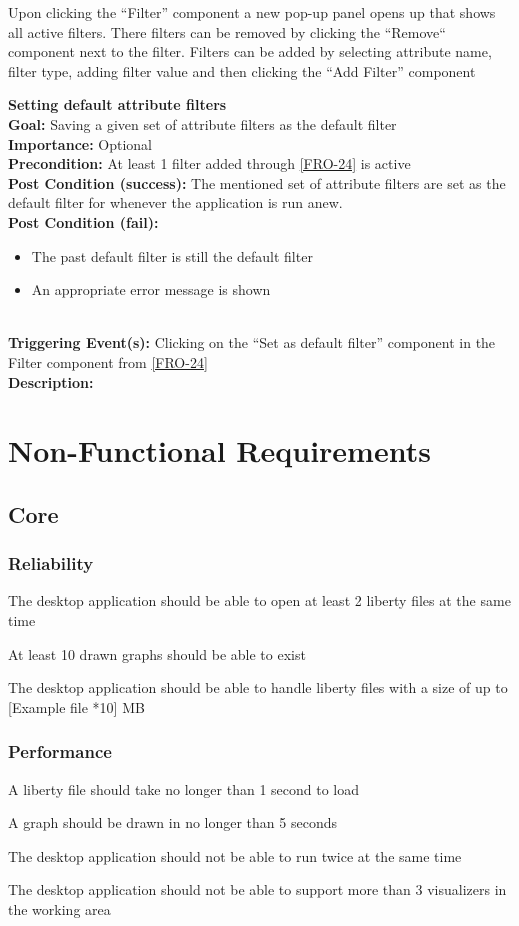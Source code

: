\documentclass[10pt,a4paper]{report}
\newcommand{\precondition}[1]{
    \textbf{Precondition: } #1 \leavevmode \\
}
\newcommand{\FRODescription}[8]{
    \textbf{#1} \leavevmode \\
    \textbf{Goal: } #2 \leavevmode \\
    \textbf{Importance: } #3 \leavevmode \\
    \precondition{#4}
    \textbf{Post Condition (success): } #5 \leavevmode \\
    \textbf{Post Condition (fail): } #6 \leavevmode \\
    \textbf{Triggering Event(s): } #7 \leavevmode \\
    \textbf{Description: } \leavevmode \\
    #8}
\begin{document}
\begin{FRO}
    {Upon clicking the “Filter” component a new pop-up panel opens up that shows all active filters. There filters can be removed by clicking the “Remove“ component next to the filter. Filters can be added by selecting attribute name, filter type, adding filter value and then clicking the “Add Filter” component}
    \item \FRODescription{Setting default attribute filters\label{FRO-25}}
    {Saving a given set of attribute filters as the default filter}
    {Optional}
    {At least 1 filter added through \ref{FRO-24} is active}
    {The mentioned set of attribute filters are set as the default filter for whenever the application is run anew.}
    {\begin{itemize}
        \item The past default filter is still the default filter
        \item An appropriate error message is shown
    \end{itemize}}
    {Clicking on the “Set as default filter” component in the Filter component from \ref{FRO-24}}
\end{FRO}

\section{Non-Functional Requirements}
\subsection{Core}
\subsubsection{Reliability}
\begin{NFR-Rel}
    \item The desktop application should be able to open at least 2 liberty files at the same time
    \item At least 10 drawn graphs should be able to exist
    \item The desktop application should be able to handle liberty files with a size of up to [Example file *10] MB
\end{NFR-Rel}

\subsubsection{Performance}
\begin{NFR-Perf}
    \item A liberty file should take no longer than 1 second to load
    \item A graph should be drawn in no longer than 5 seconds
    \item The desktop application should not be able to run twice at the same time
    \item  The desktop application should not be able to support more than 3 visualizers in the working area
\end{NFR-Perf}
\end{document}
